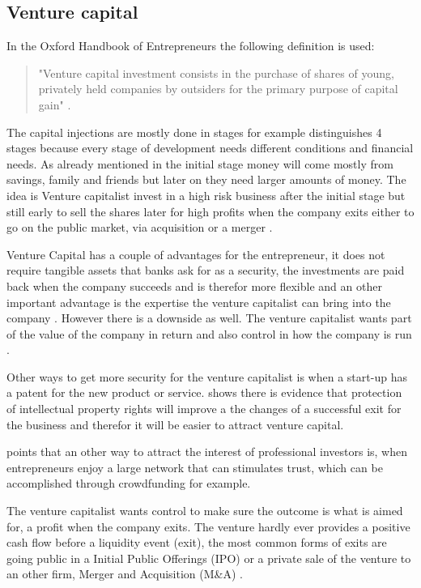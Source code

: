 \documentclass[a4paper, 11pt]{article}
\begin{document}
\subsection{Venture capital}

In the Oxford Handbook of Entrepreneurs the following definition is used:

\begin{quote}
"Venture capital investment consists in the purchase of shares of young, privately held companies by outsiders for the primary purpose of capital gain" \citep[P.355]{casson2008oxford}.
\end{quote}

The capital injections are mostly done in stages \cite{TiddBessant} for example distinguishes 4 stages because every stage of development needs different conditions and financial needs. As already mentioned in the initial stage money will come mostly from savings, family and friends but later on they need larger amounts of money. The idea is Venture capitalist invest in a high risk business after the initial stage but still early to sell the shares later for high profits when the company exits either to go on the public market, via acquisition or a merger \citep{TiddBessant}.

Venture Capital has a couple of advantages for the entrepreneur, it does not require tangible assets that banks ask for as a security, the investments are paid back when the company succeeds and is therefor more flexible and an other important advantage is the expertise the venture capitalist can bring into the company \citep{casson2008oxford}. However there is a downside as well. The venture capitalist wants part of the value of the company in return and also control in how the company is run \citep{casson2008oxford}.

Other ways to get more security for the venture capitalist is when a start-up has a patent for the new product or service.
\cite{nadeau2011innovation} shows there is evidence that protection of intellectual property rights will improve a the changes of a successful exit for the business and therefor it will be easier to attract venture capital.

 \cite{Roma} points that an other way to attract the interest of professional investors is, when entrepreneurs enjoy a large network that can stimulates trust, which can be accomplished through crowdfunding for example.


The venture capitalist wants control to make sure the outcome is what is aimed for, a profit when the company exits. The venture hardly ever provides a positive cash flow before a liquidity event (exit), the most common forms of exits are going public in a Initial Public Offerings (IPO) or a private sale of the venture to an other firm, Merger and Acquisition (M\&A) \citep{nadeau2011innovation}.
\end{document}
